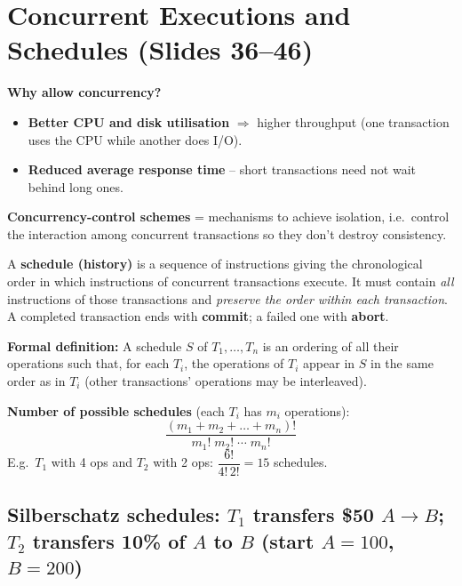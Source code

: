 \documentclass[10pt,a4paper]{article}
\begin{document}
\section{Concurrent Executions and Schedules (Slides 36--46)}

\textbf{Why allow concurrency?}
\begin{itemize}
  \item \textbf{Better CPU and disk utilisation} $\Rightarrow$ higher throughput (one transaction uses the CPU while another does I/O).
  \item \textbf{Reduced average response time} -- short transactions need not wait behind long ones.
\end{itemize}
\textbf{Concurrency-control schemes} = mechanisms to achieve isolation, i.e.\ control the interaction among concurrent transactions so they don't destroy consistency.

\begin{keybox}[Schedule]
A \textbf{schedule (history)} is a sequence of instructions giving the chronological order in which instructions of concurrent transactions execute. It must contain \emph{all} instructions of those transactions and \emph{preserve the order within each transaction}. A completed transaction ends with \textbf{commit}; a failed one with \textbf{abort}.
\end{keybox}

\textbf{Formal definition:} A schedule $S$ of $T_1,\dots,T_n$ is an ordering of all their operations such that, for each $T_i$, the operations of $T_i$ appear in $S$ in the same order as in $T_i$ (other transactions' operations may be interleaved).

\textbf{Number of possible schedules} (each $T_i$ has $m_i$ operations):
\[
\frac{(m_1+m_2+\dots+m_n)!}{m_1!\; m_2!\; \cdots\; m_n!}
\]
E.g.\ $T_1$ with 4 ops and $T_2$ with 2 ops: $\dfrac{6!}{4!\,2!}=15$ schedules.

\subsection*{Silberschatz schedules: $T_1$ transfers \$50 $A\to B$; $T_2$ transfers 10\% of $A$ to $B$ (start $A=100$, $B=200$)}
\end{document}

